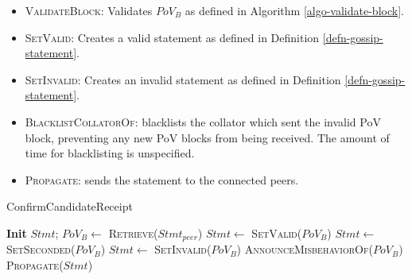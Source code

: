 \begin{itemize}
  \item \textsc{ValidateBlock}: Validates $PoV_B$ as defined in Algorithm
  \ref{algo-validate-block}.
  \item \textsc{SetValid}: Creates a valid statement as defined in Definition
  \ref{defn-gossip-statement}.
  \item \textsc{SetInvalid}: Creates an invalid statement as defined in
  Definition \ref{defn-gossip-statement}.
  \item \textsc{BlacklistCollatorOf}: blacklists the collator which sent the
  invalid PoV block, preventing any new PoV blocks from being received. The
  amount of time for blacklisting is unspecified.
  \item \textsc{Propagate}: sends the statement to the connected peers.
\end{itemize}

\begin{algorithm}[H]
  \caption[]{\sc ConfirmCandidateReceipt}
  \label{algo-endorse-candidate-receipt}
  \begin{algorithmic}[1]
      \State \textbf{Init} $Stmt$;
      \State $PoV_B \leftarrow$ \textsc{Retrieve}($Stmt_{peer}$)
          \State $Stmt \leftarrow$ \textsc{SetValid($PoV_B$)}
        \Else
          \State $Stmt \leftarrow$ \textsc{SetSeconded($PoV_B$)}
        \EndIf
      \Else
        \State $Stmt \leftarrow$ \textsc{SetInvalid($PoV_B$)}
        \State \textsc{AnnounceMisbehaviorOf}($PoV_B$)
      \EndIf
      \State \textsc{Propagate}($Stmt$)
  \end{algorithmic}
\end{algorithm}

